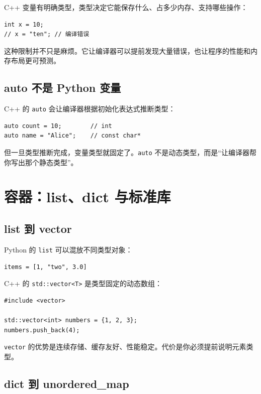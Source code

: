 \documentclass[UTF8,openany]{ctexbook}
\begin{document}
C++ 变量有明确类型，类型决定它能保存什么、占多少内存、支持哪些操作：

\begin{lstlisting}[style=cppstyle]
int x = 10;
// x = "ten"; // 编译错误
\end{lstlisting}

这种限制并不只是麻烦。它让编译器可以提前发现大量错误，也让程序的性能和内存布局更可预测。

\section{auto 不是 Python 变量}

C++ 的 \texttt{auto} 会让编译器根据初始化表达式推断类型：

\begin{lstlisting}[style=cppstyle]
auto count = 10;        // int
auto name = "Alice";    // const char*
\end{lstlisting}

但一旦类型推断完成，变量类型就固定了。\texttt{auto} 不是动态类型，而是“让编译器帮你写出那个静态类型”。

\chapter{容器：list、dict 与标准库}

\section{list 到 vector}

Python 的 \texttt{list} 可以混放不同类型对象：

\begin{lstlisting}[style=pythonstyle]
items = [1, "two", 3.0]
\end{lstlisting}

C++ 的 \texttt{std::vector<T>} 是类型固定的动态数组：

\begin{lstlisting}[style=cppstyle]
#include <vector>

std::vector<int> numbers = {1, 2, 3};
numbers.push_back(4);
\end{lstlisting}

\texttt{vector} 的优势是连续存储、缓存友好、性能稳定。代价是你必须提前说明元素类型。

\section{dict 到 unordered\_map}
\end{document}
